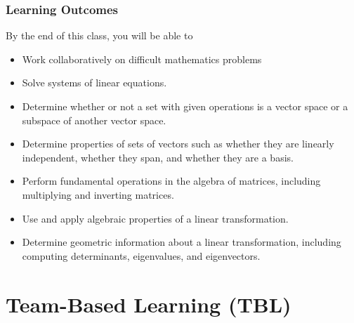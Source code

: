 \documentclass[aspectration=1610]{beamer}
\begin{document}
\begin{frame} \frametitle{Learning Outcomes }
By the end of this class, you will be able to
\begin{itemize}
\item Work collaboratively on difficult mathematics problems
\pause \item Solve systems of linear equations.
\pause \item Determine whether or not a set with given operations is a vector space or a subspace of another vector space.
\pause \item Determine properties of sets of vectors such as whether they are linearly independent, whether they span, and whether they are a basis.
\pause \item Perform fundamental operations in the algebra of matrices, including multiplying and inverting matrices.
\pause \item Use and apply algebraic properties of a linear transformation.
\pause \item Determine geometric information about a linear transformation, including computing determinants, eigenvalues, and eigenvectors.
\end{itemize}
\end{frame}





  \section{Team-Based Learning (TBL)}

%
%
%  
%
%  
%  
  
\end{document}
